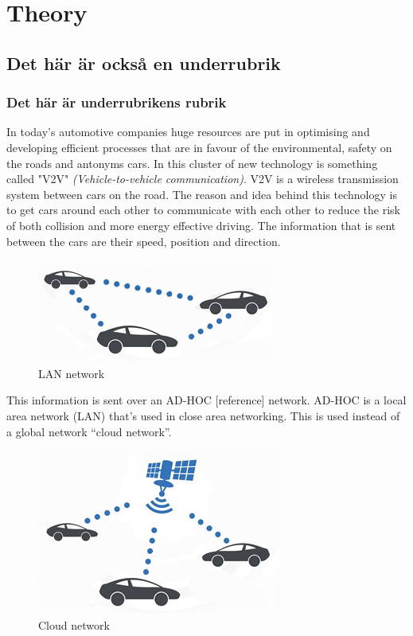 \section{Theory}
\subsection{Det här är också en underrubrik}
\subsubsection{Det här är underrubrikens rubrik}
In today's automotive companies huge resources are put in optimising and developing efficient processes that are in favour of the environmental, safety on the roads and antonyms cars. In this cluster of new technology is something called "V2V" \textit{(Vehicle-to-vehicle communication)}. V2V is a wireless transmission system between cars on the road. The reason and idea behind this technology is to get cars around each other to communicate with each other to reduce the risk of both collision and more energy effective driving. The information that is sent between the cars are their speed, position and direction.

\begin{figure}[H]
    \centering
    \includegraphics{images/V2VLan.png}
    \caption{LAN network}
\end{figure}
This information is sent over an AD-HOC [reference] network. AD-HOC is a local area network (LAN) that's used in close area networking. This is used instead of a global network “cloud network”. 
\begin{figure}[H]
    \centering
    \includegraphics{images/V2VGlobal.png}
    \caption{Cloud network}
\end{figure}


